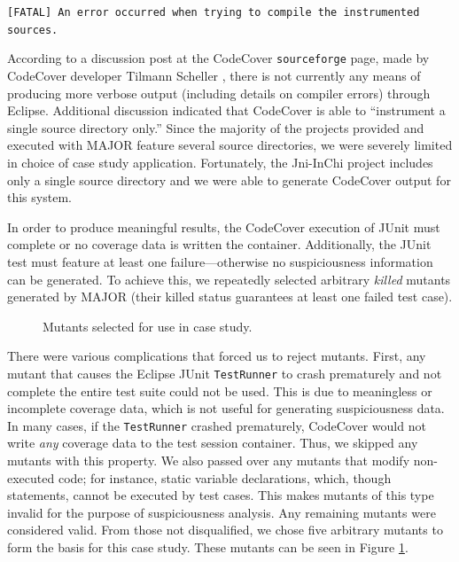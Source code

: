 \vspace{5mm}
\texttt{[FATAL] An error occurred when trying to compile the instrumented sources.}
\vspace{2mm}

According to a discussion post at the CodeCover \texttt{sourceforge}
page, made by CodeCover developer Tilmann Scheller \cite{discpost}, there is not currently any 
means of producing more verbose output (including details on compiler errors) through Eclipse.  
Additional discussion indicated that CodeCover is able to ``instrument
a single source directory only.''  Since the majority of the projects provided and executed with MAJOR
feature several source directories, we were severely limited in choice of case study application.  
Fortunately, the Jni-InChi project includes only a single source directory and we were able
to generate CodeCover output for this system.

In order to produce meaningful results, the CodeCover execution of JUnit must complete or no coverage
data is written the container.  Additionally, the JUnit test must
feature at least one failure---otherwise no
suspiciousness information can be generated.  To achieve this, we repeatedly selected
arbitrary \textit{killed} mutants generated by MAJOR (their killed status guarantees at least one failed
test case).  

\begin{figure}[tb]

\caption{Mutants selected for use in case study.}
\label{fig:mutants}
\end{figure}

There were various complications that forced us to reject mutants.  First, any mutant that
causes the Eclipse JUnit \texttt{TestRunner} to crash prematurely and not complete the entire test 
suite could not be used.  This is due to meaningless or incomplete coverage data, which is not useful
for generating suspiciousness data.  In many cases, if the \texttt{TestRunner} crashed prematurely,
CodeCover would not write \emph{any} coverage data to the test session container.  Thus, we skipped
any mutants with this property. We also passed over any mutants that modify non-executed code; for instance, static variable declarations, which, though statements, cannot be executed by test cases.  
This makes mutants of this type invalid for the purpose of suspiciousness analysis.  Any remaining
mutants were considered valid.  From those not disqualified, we chose five arbitrary mutants to 
form the basis for this case study.   These mutants can be seen in Figure \ref{fig:mutants}.

